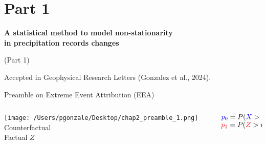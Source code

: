 \documentclass[9pt,compress]{beamer}
\begin{document}
\section{Part 1}
{
\begin{frame}
\begin{center}
\textbf{\LARGE {\color{beamer@blendedblue} A statistical method to model non-stationarity\\
 in precipitation records changes}}
 \bigskip
 \bigskip

\LARGE {\color{beamer@blendedblue} (Part 1)}
\end{center}
 \bigskip
 \bigskip
 \bigskip
 \bigskip
 
{\tiny
\begin{myboxyellow}
Accepted in Geophysical Research Letters (Gonzalez et al., 2024).
\end{myboxyellow}
}
\end{frame}




}
%
%
%
\begin{frame}{Preamble on Extreme Event Attribution (EEA) \footnotemark[7] }
\begin{columns}
\begin{column}{0.5\textwidth}
\begin{center}
\texttt{[image: /Users/pgonzale/Desktop/chap2\_preamble\_1.png]}
Counterfactual \\ 
Factual  {\color{red} $Z$}  
 \end{center}  
 \end{column}
 \pause
 \begin{column}{0.5\textwidth}
\begin{center}
${\color{blue} p_0}=P({\color{blue}X}>u)$\\ 
${\color{red} p_1}=P({\color{red}Z}>u)$\\ 
 \end{center}    
 \end{column}
 \end{columns}
\end{frame}
%
%
%
\end{document}
